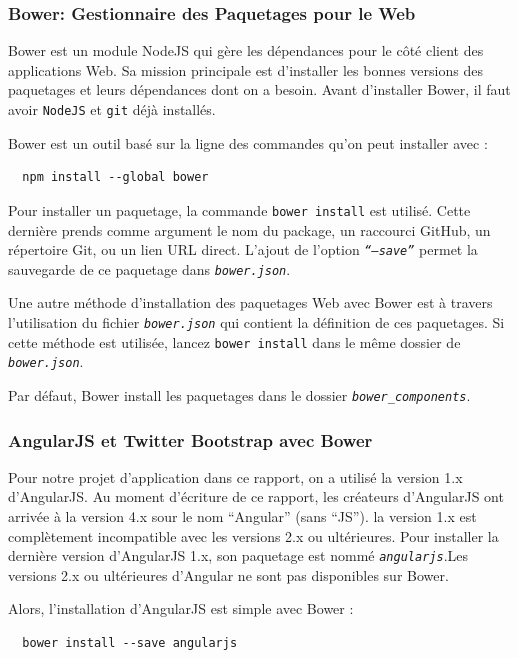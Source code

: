 \documentclass[a4paper,11pt,oneside]{report}
\begin{document}
\begin{appendices}
\subsubsection{Bower: Gestionnaire des Paquetages pour le Web}
Bower est un module NodeJS qui gère les dépendances pour le côté client des applications Web. Sa mission principale est d'installer les bonnes versions des paquetages et leurs dépendances dont on a besoin. Avant d'installer Bower, il faut avoir \texttt{NodeJS} et \texttt{git} déjà installés.
\newline

Bower est un outil basé sur la ligne des commandes qu'on peut installer avec :
  \begin{verbatim}
  npm install --global bower
  \end{verbatim}

Pour installer un paquetage, la commande \texttt{bower install} est utilisé. Cette dernière prends comme argument le nom du package, un raccourci GitHub, un répertoire Git, ou un lien URL direct. L'ajout de l'option \texttt{\emph{``---save''}} permet la sauvegarde de ce paquetage dans \texttt{\emph{bower.json}}.
\newline

Une autre méthode d'installation des paquetages Web avec Bower est à travers l'utilisation du fichier \texttt{\emph{bower.json}} qui contient la définition de ces paquetages. Si cette méthode est utilisée, lancez \texttt{bower install} dans le même dossier de \texttt{\emph{bower.json}}. 
\newline

Par défaut, Bower install les paquetages dans le dossier \texttt{\emph{bower\_components}}.

\subsubsection{AngularJS et Twitter Bootstrap avec Bower}
Pour notre projet d'application dans ce rapport, on a utilisé la version 1.x d'AngularJS. Au moment d'écriture de ce rapport, les créateurs d'AngularJS ont arrivée à la version 4.x sour le nom ``Angular'' (sans ``JS''). la version 1.x est complètement incompatible avec les versions 2.x ou ultérieures. Pour installer la dernière version d'AngularJS 1.x, son paquetage est nommé \texttt{\emph{angularjs}}.Les versions 2.x ou ultérieures d'Angular ne sont pas disponibles sur Bower.
\newline

Alors, l'installation d'AngularJS est simple avec Bower :
  \begin{verbatim}
  bower install --save angularjs
  \end{verbatim}


\end{appendices}
\end{document}
